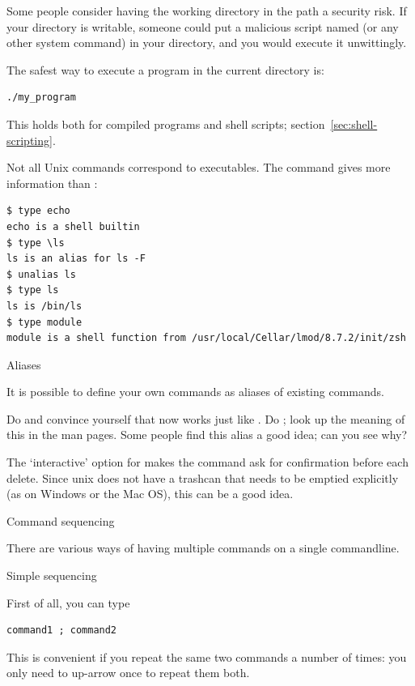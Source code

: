Some people consider having the working directory in the path a
security risk. If your directory is writable, someone could put a
malicious script named  (or any other system command) in your
directory, and you would execute it unwittingly.

The safest way to execute a program in the current directory is:
\begin{lstlisting}
./my_program
\end{lstlisting}
This holds both for compiled programs and shell scripts;
section~\ref{sec:shell-scripting}.

\begin{remark}
  Not all Unix commands correspond to executables. The
   command gives more information than :
\begin{lstlisting}
$ type echo
echo is a shell builtin
$ type \ls
ls is an alias for ls -F
$ unalias ls
$ type ls
ls is /bin/ls
$ type module
module is a shell function from /usr/local/Cellar/lmod/8.7.2/init/zsh
\end{lstlisting}
\end{remark}

 {Aliases}

It is possible to define your own commands as aliases of existing
commands.

\begin{exercise}
  Do  and convince yourself that now  works
  just like . Do ; look up the meaning of
  this in the man pages. Some people find this alias a good idea; can
  you see why?
\end{exercise}
\begin{outcome}
  The  `interactive' option for  makes the command ask for
  confirmation before each delete. Since unix does not have a trashcan
  that needs to be emptied explicitly (as on Windows or the Mac OS),
  this can be a good idea.
\end{outcome}

 {Command sequencing}
\label{tut:unix-bq}

There are various ways of having multiple commands on a single
commandline.

 {Simple sequencing}

First of all, you can type
\begin{lstlisting}
command1 ; command2
\end{lstlisting}
This is convenient if you repeat the same two commands a number of
times: you only need to up-arrow once to repeat them both.

